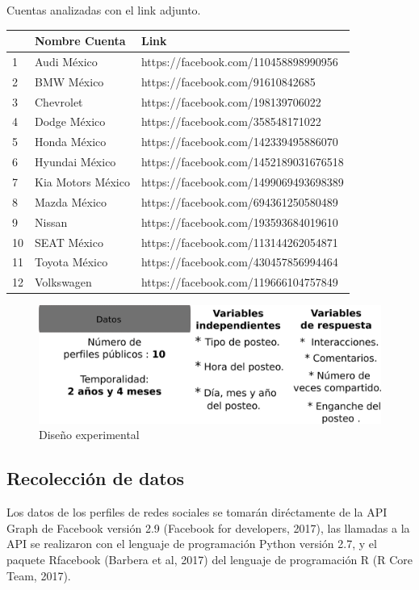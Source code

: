 \documentclass[a4paper,10pt]{article}
\begin{document}
\begin{center}
 {Cuentas analizadas con el link adjunto. } \\[0.3cm] 
{\footnotesize
   \begin{tabular} {l|l|l} 
    \hline
    & Nombre Cuenta & Link \\ 
    \hline
    1 & Audi México & https://facebook.com/110458898990956 \\
    2 & BMW México & https://facebook.com/91610842685 \\
    3 & Chevrolet & https://facebook.com/198139706022 \\
    4 & Dodge México & https://facebook.com/358548171022 \\
    5 & Honda México & https://facebook.com/142339495886070 \\
    6 & Hyundai México & https://facebook.com/1452189031676518  \\
    7 & Kia Motors México & https://facebook.com/1499069493698389 \\
    8 & Mazda México &  https://facebook.com/694361250580489 \\
    9 & Nissan &  https://facebook.com/193593684019610 \\
    10 & SEAT México & https://facebook.com/113144262054871 \\
    11 & Toyota México & https://facebook.com/430457856994464 \\
    12 & Volkswagen & https://facebook.com/119666104757849 \\
    \hline
    \end{tabular}
}
\end{center}





\begin{figure}[H]
  \begin{center}
   \includegraphics[width=.75\textwidth]{imagenes/figura1.png}
   \caption{Diseño experimental}
  \end{center} 
\end{figure}

\subsection{Recolección de datos}
Los datos de los perfiles de redes sociales se tomarán diréctamente de la API Graph de Facebook 
versión 2.9 (Facebook for developers, 2017), las llamadas a la API se realizaron con el lenguaje de programación Python
versión 2.7, y el paquete Rfacebook (Barbera et al, 2017) del lenguaje de programación R (R Core Team, 2017).
\end{document}
